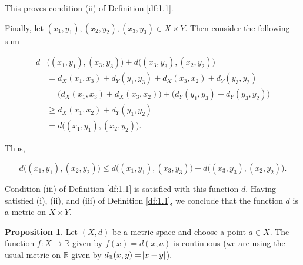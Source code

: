 \documentclass{article}
\makeatletter
\theoremstyle{definition}
\newtheorem{prop}{Proposition}[section]
\theoremstyle{remark}
\let\oldproofname=\proofname
\renewcommand{\proofname}{\bf{\textit{\oldproofname}}}
\theoremstyle{definition}
\renewenvironment{proof}[1][\proofname]{\par
  \pushQED{\qed}%
  \normalfont \topsep6\p@\@plus6\p@\relax
  \list{}{\leftmargin=0mm
          \rightmargin=0mm
          \settowidth{\itemindent}{\itshape#1}%
          \labelwidth=\itemindent
          \parsep=0pt \listparindent=0mm%
  }
  \item[\hskip\labelsep
        \itshape
    #1\@addpunct{.}]\ignorespaces
}{%
  \popQED\endlist\@endpefalse
}
\makeatother
\begin{document}
\begin{proof}
        \noindent This proves condition (ii) of Definition \ref{df:1.1}.\par \hspace{4mm} Finally, let $(x_1,y_1),(x_2,y_2),(x_3,y_3)\in X\times Y$. Then consider the following sum 
        
        \begin{equation*}
            \begin{split}
                d&\big((x_1,y_1),(x_3,y_3)\big)+d\big((x_3,y_3),(x_2,y_2)\big)\\
                &= d_X(x_1,x_3)+d_Y(y_1,y_3)+d_X(x_3,x_2)+d_Y(y_3,y_2) \\
                &= \bigg(d_X(x_1,x_3)+d_X(x_3,x_2)\bigg)+\bigg(d_Y(y_1,y_3)+d_Y(y_3,y_2)\bigg)\\
                &\geq d_X(x_1,x_2)+d_Y(y_1,y_2) \\
                &= d\big((x_1,y_1),(x_2,y_2)\big).
            \end{split}
        \end{equation*}
        
        \noindent Thus, 
        
        \begin{equation*}
            d\big((x_1,y_1),(x_2,y_2)\big)\leq d\big((x_1,y_1),(x_3,y_3)\big)+d\big((x_3,y_3),(x_2,y_2)\big).
        \end{equation*}
        
        \noindent Condition (iii) of Definition \ref{df:1.1} is satisfied with this function $d$. Having satisfied (i), (ii), and (iii) of Definition \ref{df:1.1}, we conclude that the function $d$ is a metric on $X\times Y$.   
    \end{proof}
    
    \newpage
    
    \begin{prop}\label{prop:1.2} 
        Let $(X, d)$ be a metric space and choose a point $a\in X$. The function $f\colon X\rightarrow\mathbb{R}$ given by $f(x)=d(x,a)$ is continuous (we are using the usual metric on $\mathbb{R}$ given by $d_{\mathbb{R}}(x,y)=\abs{x-y}$).
    \end{prop}
    
\end{document}
